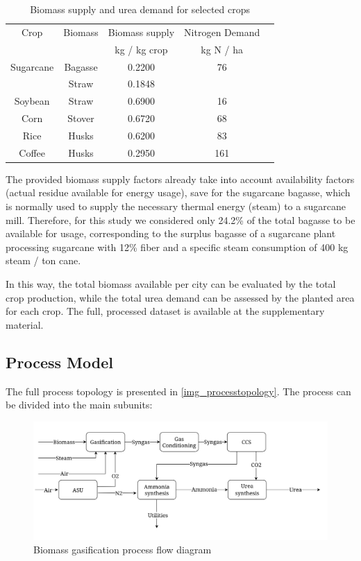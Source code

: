 \documentclass[a4paper, titlepage]{article}
\begin{document}
\begin{table}
	\centering
	\caption{Biomass supply and urea demand for selected crops}
	\label{tab_biomasssupply}
	\begin{tabular}{|c | c | c | c | c|}
		\hline
		Crop & Biomass & Biomass supply \cite{souzaTheoreticalTechnicalAssessment2021} & Nitrogen Demand \cite{IFASTATFertilizerUse2024} \\
		 & & kg / kg crop & kg N / ha \\
		 \hline
		Sugarcane & Bagasse & 0.2200 & 76 \\ 
		 & Straw & 0.1848 &  \\
		Soybean & Straw & 0.6900 & 16 \\
		Corn & Stover & 0.6720 & 68 \\
		Rice & Husks & 0.6200 & 83 \\
		Coffee & Husks & 0.2950 & 161 \\
		\hline
	\end{tabular}
\end{table}

The provided biomass supply factors already take into account availability factors (actual residue available for energy
usage), save for the sugarcane bagasse, which is normally used to supply the necessary thermal energy (steam)
to a sugarcane mill. Therefore, for this study we considered only 24.2\% of the total bagasse to be available for
usage, corresponding to the surplus bagasse of a sugarcane plant processing sugarcane with 12\% fiber and a specific 
steam consumption of 400 kg steam / ton cane. 

In this way, the total biomass available per city can be evaluated by the total crop production, while the total urea
demand can be assessed by the planted area for each crop. The full, processed dataset is available at the supplementary
material.

\subsection{Process Model}

The full process topology is presented in \autoref{img_processtopology}. The process can be divided into the main subunits:
\begin{figure}
	\includegraphics[width=\textwidth]{img/process_topology.png}
	\caption{Biomass gasification process flow diagram}
	\label{img_processtopology}
\end{figure}
\end{document}
